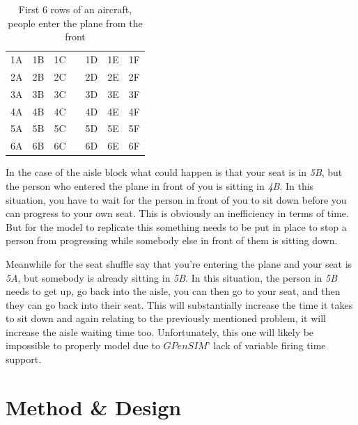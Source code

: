 \documentclass[english]{article}
\begin{document}
\begin{table}[H]
    \centering
    \begin{tabular}{|c|c|c|c|c|c|c|}
    \hline
    \rowcolor{lightgray}\multicolumn{7}{|c|}{front}\\
    \hline
        1A & 1B & 1C & \cellcolor{lightgray} & 1D & 1E & 1F \\
        2A & 2B & 2C & \cellcolor{lightgray} & 2D & 2E & 2F \\
        3A & 3B & 3C & \cellcolor{lightgray} & 3D & 3E & 3F \\
        4A & 4B & 4C & \cellcolor{lightgray} & 4D & 4E & 4F \\
        5A & 5B & 5C & \cellcolor{lightgray} & 5D & 5E & 5F \\
        6A & 6B & 6C & \cellcolor{lightgray} & 6D & 6E & 6F \\
    \hline
    \end{tabular}
    \caption{First 6 rows of an aircraft, people enter the plane from the front}
    \label{tab:example_plane}
\end{table}

In the case of the aisle block what could happen is that your seat is in \emph{5B}, but the person who entered the plane in front of you is sitting in \emph{4B}. In this situation, you have to wait for the person in front of you to sit down before you can progress to your own seat. This is obviously an inefficiency in terms of time. But for the model to replicate this something needs to be put in place to stop a person from progressing while somebody else in front of them is sitting down.

Meanwhile for the seat shuffle say that you're entering the plane and your seat is \emph{5A}, but somebody is already sitting in \emph{5B}. In this situation, the person in \emph{5B} needs to get up, go back into the aisle, you can then go to your seat, and then they can go back into their seat. This will substantially increase the time it takes to sit down and again relating to the previously mentioned problem, it will increase the aisle waiting time too. Unfortunately, this one will likely be impossible to properly model due to $GPenSIM$' lack of variable firing time support. 


\section{Method \& Design}
\end{document}
